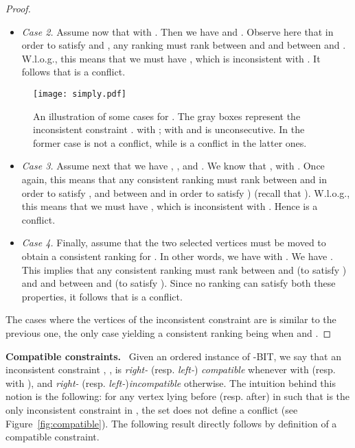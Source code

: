 \documentclass[11pt]{article}
\begin{document}
\begin{proof}
\begin{itemize}
	\item \emph{Case 2.} Assume now that  with . Then we have  and . Observe here that in order to satisfy  and , any ranking  must rank  between  and  and between  and . W.l.o.g., this means 
	that we must have , which is inconsistent 
	with . It follows that  is a conflict. 
	
	\end{itemize}
	
	\begin{figure}
	\label{fig:two}
	
		\centerline{\texttt{[image: simply.pdf]}}
		\caption{An illustration of some cases for . The gray boxes represent the inconsistent constraint .   with ;   with  and  
		 is unconsecutive. In the former case  is not a conflict, while  is a conflict in the latter ones. }
	
	\end{figure}
	
	\begin{itemize}

	\item \emph{Case 3.} Assume next that we have , , and . We know that , with . Once again, this means that any consistent ranking  
	must rank  between  and  in order to satisfy , and  between  and 
	 in order to satisfy ) (recall that ). W.l.o.g., this means that we must have 
	, which is inconsistent with . Hence  is a conflict. 
	
	\item \emph{Case 4.} Finally, assume that the two selected vertices must be moved to obtain a consistent ranking for . In other words, we have  with . We have . This implies that any consistent ranking must rank  between 
 and  (to satisfy ) and  and  between  and 
 (to satisfy ). Since no ranking can satisfy both these 
properties, it follows that  is a conflict. 
	\end{itemize}
	
	The cases where the vertices of the inconsistent constraint are  is similar to the previous one, the only case yielding a consistent ranking being when  and .
\end{proof}

\noindent \textbf{Compatible constraints.}~ 
Given an ordered instance   of -BIT, we say that an inconsistent constraint , , is \emph{right-} (resp. \emph{left-}) \emph{compatible} whenever  with  (resp.  with ), and \emph{right-} (resp. \emph{left-})\emph{incompatible} otherwise. The intuition behind this notion is the following: for any vertex  lying before (resp. after)  in  such that  is the only inconsistent constraint in , the set  does not define a conflict (see Figure~\ref{fig:compatible}). The following result directly follows by definition of a compatible constraint. 
\end{document}
